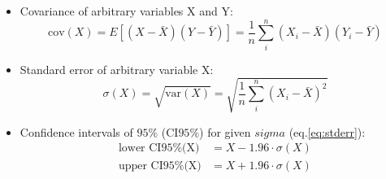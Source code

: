 \documentclass[a4paper,11pt]{article}
\begin{document}
\begin{itemize}
\begin{equation}
\end{equation}
\item Covariance of arbitrary variables X and Y:
\begin{equation} \label{eq:cov}
\textrm{cov}(X) = E\left[ (X-\bar X)(Y-\bar Y) \right] = \frac{1}{n} \sum^{n}_{i} (X_i-\bar{X})(Y_i-\bar{Y})
\end{equation}
\item Standard error of arbitrary variable X:
\begin{equation} \label{eq:stderr}
\sigma(X) = \sqrt{\textrm{var}(X)} =  \sqrt{ \frac{1}{n} \sum^{n}_{i} (X_i-\bar X)^2 }
\end{equation}
\item Confidence intervals of $95\%$ (CI$95\%$) for given $sigma$ (eq.\ref{eq:stderr}):
\begin{subequations}
\begin{align}
\textrm{lower CI95\%(X)} &= X - 1.96\cdot \sigma(X)\\
\textrm{upper CI95\%(X)} &= X + 1.96\cdot \sigma(X)
\end{align}
\end{subequations}
\end{itemize}
\end{document}
